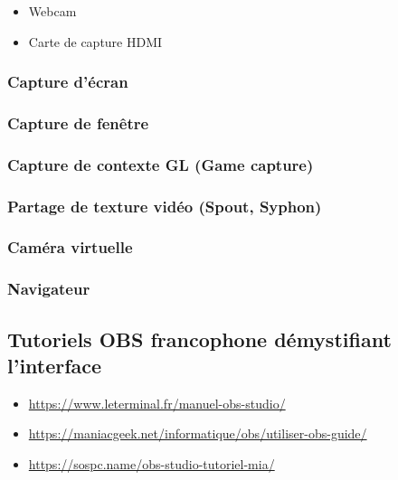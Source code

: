 \documentclass[
  french,
]{book}
\providecommand{\tightlist}{%
  \setlength{\itemsep}{0pt}\setlength{\parskip}{0pt}}
\begin{document}
\begin{itemize}
\tightlist
\item
  Webcam
\item
  Carte de capture HDMI
\end{itemize}

\hypertarget{capture-duxe9cran}{%
\subsubsection{Capture d'écran}\label{capture-duxe9cran}}

\hypertarget{capture-de-fenuxeatre}{%
\subsubsection{Capture de fenêtre}\label{capture-de-fenuxeatre}}

\hypertarget{capture-de-contexte-gl-game-capture}{%
\subsubsection{Capture de contexte GL (Game capture)}\label{capture-de-contexte-gl-game-capture}}

\hypertarget{partage-de-texture-viduxe9o-spout-syphon}{%
\subsubsection{Partage de texture vidéo (Spout, Syphon)}\label{partage-de-texture-viduxe9o-spout-syphon}}

\hypertarget{camuxe9ra-virtuelle}{%
\subsubsection{Caméra virtuelle}\label{camuxe9ra-virtuelle}}

\hypertarget{navigateur}{%
\subsubsection{Navigateur}\label{navigateur}}

\hypertarget{tutoriels-obs-francophone-duxe9mystifiant-linterface}{%
\subsection{Tutoriels OBS francophone démystifiant l'interface}\label{tutoriels-obs-francophone-duxe9mystifiant-linterface}}

\begin{itemize}
\tightlist
\item
  \url{https://www.leterminal.fr/manuel-obs-studio/}
\item
  \url{https://maniacgeek.net/informatique/obs/utiliser-obs-guide/}
\item
  \url{https://sospc.name/obs-studio-tutoriel-mia/}
\end{itemize}
\end{document}
